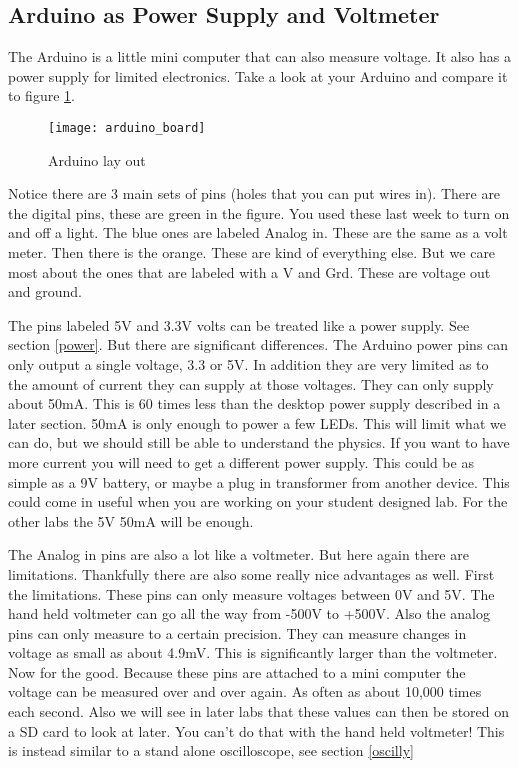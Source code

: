 \subsection{Arduino as Power Supply and Voltmeter}
\label{ArduinoTour}
The Arduino is a little mini computer that can also measure voltage. It also has a power supply for limited electronics. Take a look at your Arduino and compare it to figure \ref{ArduinoLayOut}.
\begin{figure}[h!]
	\caption{Arduino lay out\label{ArduinoLayOut}}
	\texttt{[image: arduino\_board]}
\end{figure}
Notice there are 3 main sets of pins (holes that you can put wires in). There are the digital pins, these are green in the figure. You used these last week to turn on and off a light. The blue ones are labeled Analog in. These are the same as a volt meter. Then there is the orange. These are kind of everything else. But we care most about the ones that are labeled with a V and Grd. These are voltage out and ground. 

The pins labeled 5V and 3.3V volts can be treated like a power supply. See section \ref{power}. But there are significant differences. The Arduino power pins can only output a single voltage, 3.3 or 5V. In addition they are very limited as to the amount of current they can supply at those voltages. They can only supply about 50mA. This is 60 times less than the desktop power supply described in a later section. 50mA is only enough to power a few LEDs. This will limit what we can do, but we should still be able to understand the physics. If you want to have more current you will need to get a different power supply. This could be as simple as a 9V battery, or maybe a plug in transformer from another device. This could come in useful when you are working on your student designed lab. For the other labs the 5V 50mA will be enough. 

The Analog in pins are also a lot like a voltmeter. But here again there are limitations. Thankfully there are also some really nice advantages as well. First the limitations. These pins can only measure voltages between 0V and 5V. The hand held voltmeter can go all the way from -500V to +500V. Also the analog pins can only measure to a certain precision. They can measure changes in voltage as small as about 4.9mV. This is significantly larger than the voltmeter.  Now for the good. Because these pins are attached to a mini computer the voltage can be measured over and over again. As often as about 10,000 times each second. Also we will see in later labs that these values can then be stored on a SD card to look at later. You can't do that with the hand held voltmeter! This is instead similar to a stand alone oscilloscope, see section \ref{oscilly}


